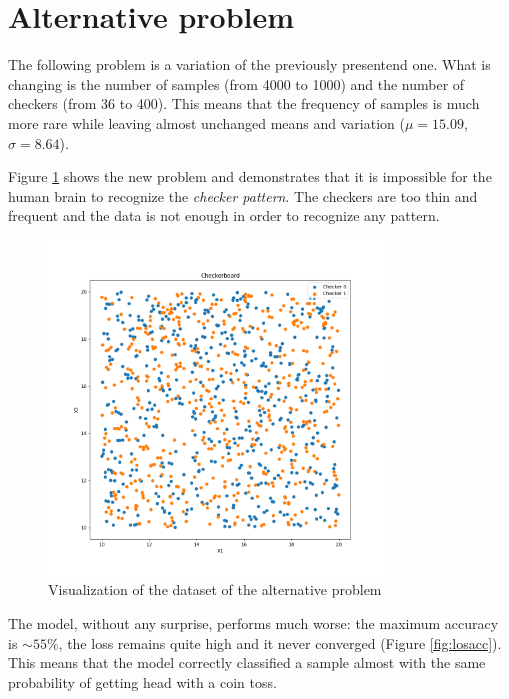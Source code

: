 \documentclass[compsoc]{IEEEtran}
\begin{document}
\section{Alternative problem}
The following problem is a variation of the previously presentend one. What is changing is the number of samples (from 4000 to 1000) and the number of checkers (from 36 to 400). This means that the frequency of samples is much more rare while leaving almost unchanged means and variation ($\mu=15.09$, $\sigma=8.64$). \par
Figure \ref{fig:checkerboard2} shows the new problem and demonstrates that it is impossible for the human brain to recognize the \emph{checker pattern}. The checkers are too thin and frequent and the data is not enough in order to recognize any pattern. \par
\begin{figure}[ht!]
\centering                                                                        
\includegraphics[width=3.5in]{../images/checkerboard-2.png}
\captionsetup{justification=centering}                                                                                                                                   
\caption{Visualization of the dataset of the alternative problem}
\label{fig:checkerboard2}                                                                                                                                                           
\end{figure}
The model, without any surprise, performs much worse: the maximum accuracy is $\sim55\%$, the loss remains quite high and it never converged (Figure \ref{fig:losacc}).
This means that the model correctly classified a sample almost with the same probability of getting head with a coin toss. 
\end{document}
